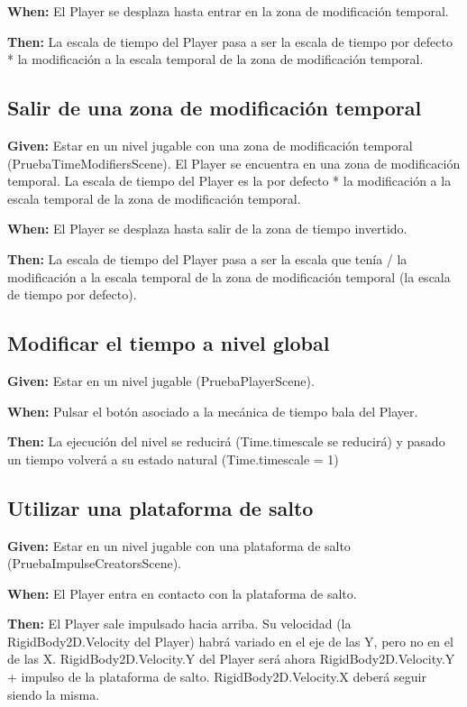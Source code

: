 \textbf{When:} El Player se desplaza hasta entrar en la zona de modificación temporal.

\textbf{Then:} La escala de tiempo del Player pasa a ser la escala de tiempo por defecto * la modificación a la escala temporal de la zona de modificación temporal.

\subsection{Salir de una zona de modificación temporal}
\textbf{Given:} Estar en un nivel jugable con una zona de modificación temporal (PruebaTimeModifiersScene). El Player se encuentra en una zona de modificación temporal. La escala de tiempo del Player es la por defecto * la modificación a la escala temporal de la zona de modificación temporal.

\textbf{When:} El Player se desplaza hasta salir de la zona de tiempo invertido.

\textbf{Then:} La escala de tiempo del Player pasa a ser la escala que tenía / la modificación a la escala temporal de la zona de modificación temporal (la escala de tiempo por defecto).

\subsection{Modificar el tiempo a nivel global}
\textbf{Given:} Estar en un nivel jugable (PruebaPlayerScene).

\textbf{When:} Pulsar el botón asociado a la mecánica de tiempo bala del Player.

\textbf{Then:} La ejecución del nivel se reducirá (Time.timescale se reducirá) y pasado un tiempo volverá a su estado natural (Time.timescale = 1)

\subsection{Utilizar una plataforma de salto}
\textbf{Given:} Estar en un nivel jugable con una plataforma de salto (PruebaImpulseCreatorsScene).

\textbf{When:} El Player entra en contacto con la plataforma de salto.

\textbf{Then:} El Player sale impulsado hacia arriba. Su velocidad (la RigidBody2D.Velocity del Player) habrá variado en el eje de las Y, pero no en el de las X. RigidBody2D.Velocity.Y del Player será ahora RigidBody2D.Velocity.Y + impulso de la plataforma de salto. RigidBody2D.Velocity.X deberá seguir siendo la misma.


